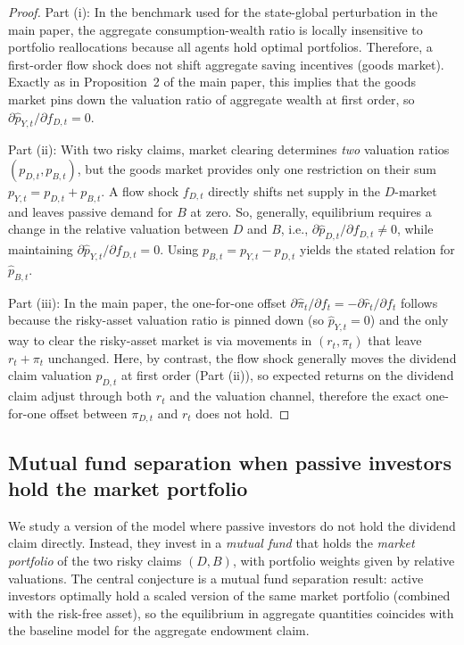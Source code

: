 \documentclass[11pt,english]{article}
\begin{document}
\begin{proof}
Part (i): In the benchmark used for the state-global perturbation in the main paper, the aggregate consumption-wealth ratio is locally insensitive to portfolio reallocations because all agents hold optimal portfolios. Therefore, a first-order flow shock does not shift aggregate saving incentives (goods market). Exactly as in Proposition~2 of the main paper, this implies that the goods market pins down the valuation ratio of aggregate wealth at first order, so $\partial \hat p_{Y,t}/\partial f_{D,t}=0$.

Part (ii): With two risky claims, market clearing determines \emph{two} valuation ratios $(p_{D,t},p_{B,t})$, but the goods market provides only one restriction on their sum $p_{Y,t}=p_{D,t}+p_{B,t}$. A flow shock $f_{D,t}$ directly shifts net supply in the $D$-market and leaves passive demand for $B$ at zero. So, generally, equilibrium requires a change in the relative valuation between $D$ and $B$, i.e., $\partial \hat p_{D,t}/\partial f_{D,t}\neq 0$, while maintaining $\partial \hat p_{Y,t}/\partial f_{D,t}=0$. Using $p_{B,t}=p_{Y,t}-p_{D,t}$ yields the stated relation for $\hat p_{B,t}$.

Part (iii): In the main paper, the one-for-one offset $\partial \hat\pi_t/\partial f_t=-\partial \hat r_t/\partial f_t$ follows because the risky-asset valuation ratio is pinned down (so $\hat p_{Y,t}=0$) and the only way to clear the risky-asset market is via movements in $(r_t,\pi_t)$ that leave $r_t+\pi_t$ unchanged. Here, by contrast, the flow shock generally moves the dividend claim valuation $p_{D,t}$ at first order (Part (ii)), so expected returns on the dividend claim adjust through both $r_t$ and the valuation channel, therefore the exact one-for-one offset between $\pi_{D,t}$ and $r_t$ does not hold.
\end{proof}

\subsection{Mutual fund separation when passive investors hold the market portfolio}\label{sec:mf_separation}

We study a version of the model where passive investors do not hold the dividend claim directly. Instead, they invest in a \textit{mutual fund} that holds the \emph{market portfolio} of the two risky claims $(D,B)$, with portfolio weights given by relative valuations. 
The central conjecture is a mutual fund separation result: active investors optimally hold a scaled version of the same market portfolio (combined with the risk-free asset), so the equilibrium in aggregate quantities coincides with the baseline model for the aggregate endowment claim.
\end{document}
